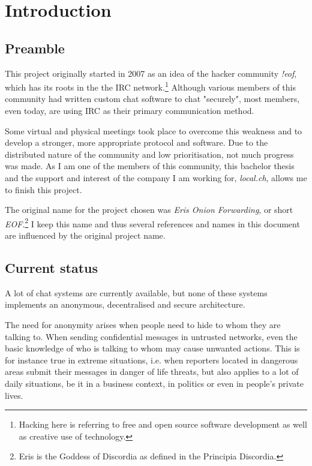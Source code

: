 \chapter{Introduction}
\section{Preamble}
This project originally started in 2007 as an idea of the hacker
community \textit{!eof}, which has its roots in the the IRC
network.\footnote{Hacking here is referring to free and open source
software development as well as creative use of technology.}
Although various members of this community had written custom chat software
to chat "securely", most members, even today, are using IRC as their
primary communication method.

Some virtual and physical meetings took place to overcome this weakness
and to develop a stronger, more appropriate protocol and software.
Due to the distributed nature of the community and low prioritisation, not
much progress was made. As I am one of the members of this community,
this bachelor thesis and the support and interest
of the company I am working for, \textit{local.ch}, allows me to finish
this project.

The original name for the project chosen was \textit{Eris Onion Forwarding}, or
short \textit{EOF}.\footnote{Eris is the Goddess of Discordia as defined
in the Principia Discordia.}
I keep this name and thus several references and names
in this document are influenced by the original project name.
\section{Current status}
A lot of chat systems are currently available, 
but none of these systems implements an anonymous, decentralised and secure architecture.

The need for anonymity arises when people need to hide to whom they are talking to. 
When sending confidential messages 
in untrusted networks, even the basic knowledge of who is talking to whom may 
cause unwanted actions.
This is for instance true in extreme situations, i.e. when reporters located in 
dangerous areas submit their messages in danger of life threats, but also 
applies to a lot of daily situations, be it in a business context,
in politics or even in people's private lives. 

